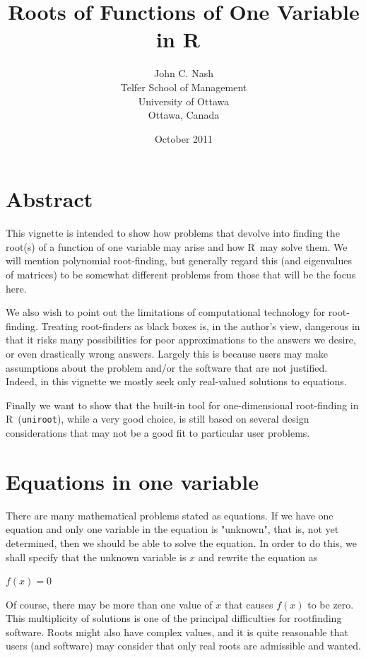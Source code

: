 \documentclass[11pt,letterpaper]{article}
\newcommand{\R}{{\sf R\ }}
\begin{document}


\title{Roots of Functions of One Variable in \R}
\author{John C. Nash\\ Telfer School of Management\\ University of Ottawa\\Ottawa, Canada}
\date{October 2011}
\maketitle

\section*{Abstract}


This vignette is intended to show how problems that devolve into finding the root(s) of a function
of one variable may arise and how \R  may solve them. We will mention polynomial root-finding, but 
generally regard this (and eigenvalues of matrices) to be somewhat different problems from those that
will be the focus here. 

We also wish to point out the limitations of computational technology for root-finding. Treating
root-finders as black boxes is, in the author's view, dangerous in that it risks many possibilities for poor approximations to the answers we desire, or even drastically wrong answers. Largely this is because users may make assumptions about the problem and/or the software that are not justified.  Indeed, in this vignette we mostly seek only real-valued solutions to equations. 

Finally we want to show that the built-in tool for one-dimensional root-finding in \R  (\texttt{uniroot}), while a very good choice, is still based on several design considerations that may not be a good fit to particular user problems.

\section{Equations in one variable}

There are many mathematical problems stated as equations. If we have one equation and only one variable in the equation is "unknown", that is, not yet determined, then we should be able to solve the equation. In order to do this, we shall specify that the unknown variable is $x$ and rewrite the equation as

$f(x) = 0$

Of course, there may be more than one value of $x$ that causes $f(x)$ to be zero. This multiplicity of solutions is one of the principal difficulties for rootfinding software. 
Roots might also have complex values, and it is quite reasonable that users (and software) may consider that only real roots are admissible and wanted. 
\end{document}
